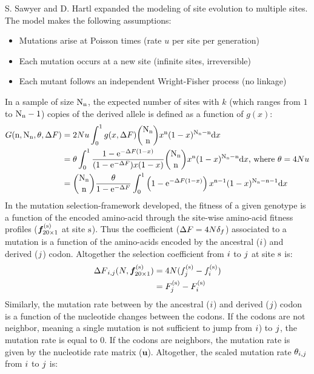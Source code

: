 S. Sawyer and D. Hartl expanded the modeling of site evolution to multiple sites.
The model makes the following assumptions: 
\begin{itemize}
	\setlength\itemsep{-0.2em}
	\item Mutations arise at Poisson times (rate $u$ per site per generation)
	\item Each mutation occurs at a new site (infinite sites, irreversible)
	\item Each mutant follows an independent Wright-Fisher process (no linkage)
\end{itemize}
In a sample of size $\text{N}_{\text{n}}$, the expected number of sites with $k$ (which ranges from $1$ to $\text{N}_{\text{n}}-1$) copies of the derived allele is defined as a function of $g(x)$:
\begin{align}
G(\text{n}, \text{N}_{\text{n}}, \theta, {\Delta F}) & = 2 N u \int_{0}^{1} g(x, {\Delta F}) \binom{\text{N}_{\text{n}}}{\text{n}} x^{\text{n}} (1-x)^{\text{N}_{\text{n}}-\text{n}} \mathrm{d} x \nonumber \\
& = \theta \int_{0}^{1} \dfrac{1 - \mathrm{e}^{-{\Delta F} (1-x)}}{(1 - \mathrm{e}^{-{\Delta F}})x(1-x)} \binom{\text{N}_{\text{n}}}{\text{n}} x^{\text{n}} (1-x)^{\text{N}_{\text{n}}-\text{n}} \mathrm{d} x\text{, where } \theta=4N u \nonumber \\
& = \binom{\text{N}_{\text{n}}}{\text{n}} \dfrac{\theta }{1 - \mathrm{e}^{-{\Delta F}}} \int_{0}^{1} \left( 1 - \mathrm{e}^{-{\Delta F} (1-x)} \right) x^{\text{n}-1} (1-x)^{\text{N}_{\text{n}}-\text{n}-1} \mathrm{d} x
\end{align}
In the mutation selection-framework developed, the fitness of a given genotype is a function of the encoded amino-acid through the site-wise amino-acid fitness profiles ($ \bm{f}_{20\times1}^{(\text{s})} $ at site $\text{s}$). Thus the coefficient (${\Delta F}=4N {\delta_{f}} $) associated to a mutation is a function of the amino-acids encoded by the ancestral (${i}$) and derived (${j}$) codon. Altogether the selection coefficient from ${i}$ to ${j}$ at site $\text{s}$ is:
\begin{align}
{\Delta F}_{{i}, {j}}(N, \bm{f}_{20\times1}^{(\text{s})}) &= 4 N (f_{j}^{(\text{s})}-f_{i}^{(\text{s})}) \nonumber \\
& = F_{j}^{(\text{s})}-F_{i}^{(\text{s})}
\end{align}
Similarly, the mutation rate between by the ancestral (${i}$) and derived (${j}$) codon is a function of the nucleotide changes between the codons. If the codons are not neighbor, meaning a single mutation is not sufficient to jump from ${i}$) to ${j}$, the mutation rate is equal to $0$. If the codons are neighbors, the mutation rate is given by the nucleotide rate matrix ($ \bm{u} $). Altogether, the scaled mutation rate $\theta_{{i}, {j}}$ from ${i}$ to ${j}$ is:
